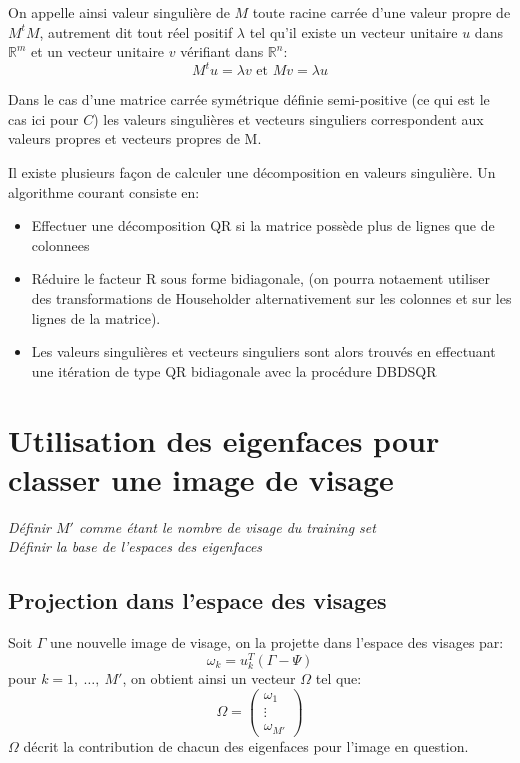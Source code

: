 \documentclass[12pt,french]{article}
\theoremstyle{plain}
\theoremstyle{definition}
\begin{document}
On appelle ainsi valeur singulière de $M$ toute racine carrée d'une valeur propre de $M^t M$, autrement dit tout réel positif $\lambda$ tel qu'il existe un vecteur unitaire $u$ dans $\mathbb{R}^m$ et un vecteur unitaire $v$ vérifiant dans $\mathbb{R}^n$:
$$ M^t u = \lambda v \text{ et } Mv = \lambda u$$

Dans le cas d'une matrice carrée symétrique définie semi-positive (ce qui est le cas ici pour $C$) les valeurs singulières et vecteurs singuliers correspondent aux valeurs propres et vecteurs propres de M.


Il existe plusieurs façon de calculer une décomposition en valeurs singulière. Un algorithme courant consiste en:
\begin{itemize}
\item Effectuer une décomposition QR si la matrice possède plus de lignes que de colonnees
\item Réduire le facteur R sous forme bidiagonale, (on pourra notaement utiliser des transformations de Householder alternativement sur les colonnes et sur les lignes de la matrice).
\item Les valeurs singulières et vecteurs singuliers sont alors trouvés en effectuant une itération de type QR bidiagonale avec la procédure DBDSQR
\end{itemize}

\section{Utilisation des eigenfaces pour classer une image de visage}
\emph{Définir $M'$ comme étant le nombre de visage du training set}\\
\emph{Définir la base de l'espaces des eigenfaces}

\subsection{Projection dans l'espace des visages}
Soit $\Gamma$ une nouvelle image de visage, on la projette dans l'espace des visages par:
$$\omega_k = u_k^T(\Gamma - \Psi)$$
pour $k = 1,~\dots,~M'$, on obtient ainsi un vecteur $\Omega$ tel que:
\[\Omega =
  \begin{pmatrix}
    \omega_1 \\
    \vdots \\
    \omega_{M'}
  \end{pmatrix}
\]
$\Omega$ décrit la contribution de chacun des eigenfaces pour l'image en question.
\end{document}
